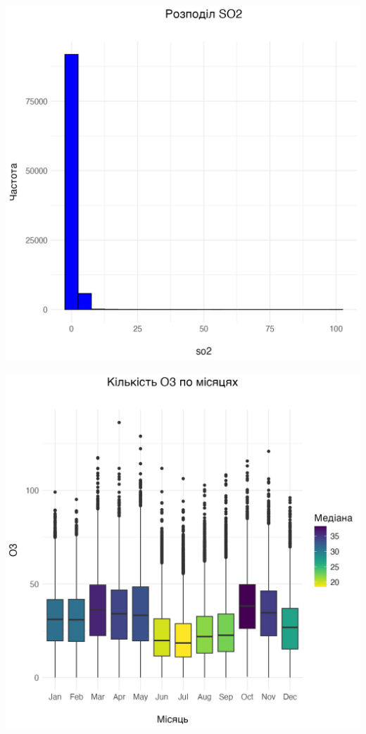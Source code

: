 \documentclass[./report.tex]{subfiles}
\begin{document}
\begin{enumerate}
  \includegraphics[width=\linewidth]{plots/question2/so2_plot.png}

  \includegraphics[width=\linewidth]{plots/question2/seasonal_o3.png}


\end{enumerate}
\end{document}
